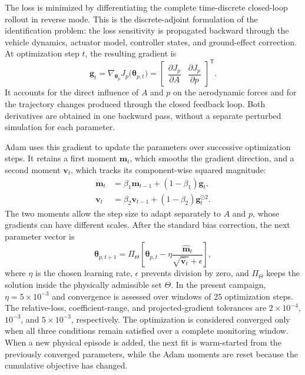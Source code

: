 \documentclass[journal]{IEEEtran}
\begin{document}
The loss is minimized by differentiating the complete time-discrete closed-loop rollout in reverse mode. This is the discrete-adjoint formulation of the identification problem: the loss sensitivity is propagated backward through the vehicle dynamics, actuator model, controller states, and ground-effect correction. At optimization step $t$, the resulting gradient is
\begin{equation}
 \mathbf{g}_t=
 \nabla_{\boldsymbol{\theta}_p}J_p
 \bigl(\boldsymbol{\theta}_{p,t}\bigr)
 =
 \begin{bmatrix}
 \dfrac{\partial J_p}{\partial A} &
 \dfrac{\partial J_p}{\partial p}
 \end{bmatrix}^{\mathsf T}.
 \label{eq:adjoint-gradient}
\end{equation}
It accounts for the direct influence of $A$ and $p$ on the aerodynamic forces and for the trajectory changes produced through the closed feedback loop. Both derivatives are obtained in one backward pass, without a separate perturbed simulation for each parameter.

Adam uses this gradient to update the parameters over successive optimization steps. It retains a first moment $\mathbf{m}_t$, which smooths the gradient direction, and a second moment $\mathbf{v}_t$, which tracks its component-wise squared magnitude:
\begin{align}
 \mathbf{m}_t &=
 \beta_1\mathbf{m}_{t-1}
 +(1-\beta_1)\mathbf{g}_t,\\
 \mathbf{v}_t &=
 \beta_2\mathbf{v}_{t-1}
 +(1-\beta_2)\mathbf{g}_t^{\odot 2}.
 \label{eq:adam-moments}
\end{align}
The two moments allow the step size to adapt separately to $A$ and $p$, whose gradients can have different scales. After the standard bias correction, the next parameter vector is
\begin{equation}
 \boldsymbol{\theta}_{p,t+1}=
 \Pi_{\Theta}\!\left[
 \boldsymbol{\theta}_{p,t}
 -\eta
 \frac{\widehat{\mathbf{m}}_t}
 {\sqrt{\widehat{\mathbf{v}}_t}+\epsilon}
 \right],
 \label{eq:adjoint-adam}
\end{equation}
where $\eta$ is the chosen learning rate, $\epsilon$ prevents division by zero, and $\Pi_{\Theta}$ keeps the solution inside the physically admissible set $\Theta$. In the present campaign, $\eta=5\times10^{-3}$ and convergence is assessed over windows of 25 optimization steps. The relative-loss, coefficient-range, and projected-gradient tolerances are $2\times10^{-4}$, $10^{-3}$, and $5\times10^{-3}$, respectively. The optimization is considered converged only when all three conditions remain satisfied over a complete monitoring window. When a new physical episode is added, the next fit is warm-started from the previously converged parameters, while the Adam moments are reset because the cumulative objective has changed.
\end{document}

